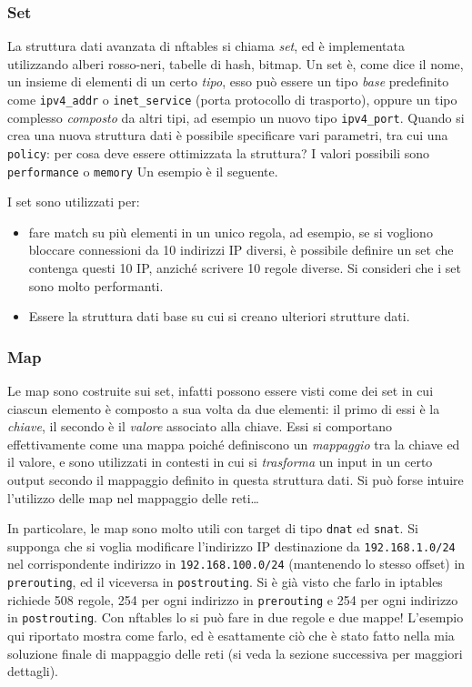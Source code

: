 \subsubsection{Set}
La struttura dati avanzata di nftables si chiama \textit{set}, ed è implementata
utilizzando alberi rosso-neri, tabelle di hash, bitmap.
Un set è, come dice il nome, un insieme di elementi di un certo \textit{tipo},
esso può essere un tipo \textit{base} predefinito come \texttt{ipv4\_addr} o
\texttt{inet\_service} (porta protocollo di trasporto), oppure un tipo complesso
\textit{composto} da altri tipi, ad esempio un nuovo tipo \texttt{ipv4\_port}.
Quando si crea una nuova struttura dati è possibile specificare vari parametri,
tra cui una \texttt{policy}: per cosa deve essere ottimizzata la struttura?
I valori possibili sono \texttt{performance} o \texttt{memory}
Un esempio è il seguente.

I set sono utilizzati per:
\begin{itemize}
  \item fare match su più elementi in un unico regola, ad esempio, se si vogliono
  bloccare connessioni da 10 indirizzi IP diversi, è possibile definire un set
  che contenga questi 10 IP, anziché scrivere 10 regole diverse. Si consideri che
  i set sono molto performanti.
  \item Essere la struttura dati base su cui si creano ulteriori strutture dati.
\end{itemize}


\subsubsection{Map}
Le map sono costruite sui set, infatti possono essere visti come dei set in cui
ciascun elemento è composto a sua volta da due elementi: il primo di essi
è la \textit{chiave}, il secondo è il \textit{valore} associato alla chiave. Essi
si comportano effettivamente come una mappa poiché definiscono un \textit{mappaggio}
tra la chiave ed il valore, e sono utilizzati in contesti in cui si \textit{trasforma}
un input in un certo output secondo il mappaggio definito in questa struttura dati.
Si può forse intuire l'utilizzo delle map nel mappaggio delle reti\ldots


In particolare, le map sono molto utili con target di tipo \texttt{dnat} ed \texttt{snat}.
Si supponga che si voglia modificare l'indirizzo IP destinazione da \texttt{192.168.1.0/24}
nel corrispondente indirizzo in \texttt{192.168.100.0/24} (mantenendo lo stesso
offset) in \texttt{prerouting}, ed il viceversa in \texttt{postrouting}. Si
è già visto che farlo in iptables richiede 508 regole, 254 per ogni indirizzo in
\texttt{prerouting} e 254 per ogni indirizzo in \texttt{postrouting}. Con nftables
lo si può fare in due regole e due mappe!
L'esempio qui riportato mostra come farlo, ed è esattamente ciò che è stato fatto
nella mia soluzione finale di mappaggio delle reti (si veda la sezione successiva
per maggiori dettagli).


